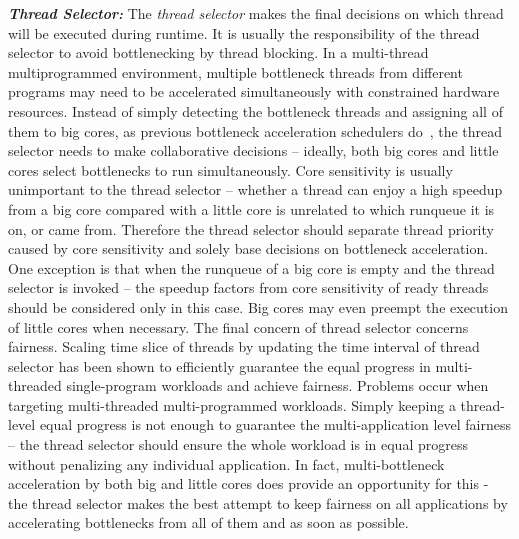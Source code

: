 \textbf{\textit{Thread Selector:}}
The \textit{thread selector} makes the final decisions on which thread will be executed during runtime. It is usually the responsibility of the thread selector to avoid bottlenecking by thread blocking. In a multi-thread multiprogrammed environment, multiple bottleneck threads from different programs may need to be accelerated simultaneously with constrained hardware resources. Instead of simply detecting the bottleneck threads and assigning all of them to big cores, as previous bottleneck acceleration schedulers do~\cite{jibaja2016portable,joao2013utility,joao2012bottleneck}, the thread selector needs to make collaborative decisions -- ideally, both big cores and little cores select bottlenecks to run simultaneously.
Core sensitivity is usually unimportant to the thread selector -- whether a thread can enjoy a high speedup from a big core compared with a little core is unrelated to which runqueue it is on, or came from. Therefore the thread selector should separate thread priority caused by core sensitivity and solely base decisions on bottleneck acceleration. One exception is that when the runqueue of a big core is empty and the thread selector is invoked -- the speedup factors from core sensitivity of ready threads should be considered only in this case. Big cores may even preempt the execution of little cores when necessary.  
The final concern of thread selector concerns fairness. Scaling time slice of threads by updating the time interval of thread selector has been shown to efficiently guarantee the equal progress \cite{van2013fairness} in multi-threaded single-program workloads and achieve fairness. 
Problems occur when targeting multi-threaded multi-programmed workloads. Simply keeping a thread-level equal progress is not enough to guarantee the multi-application level fairness -- the thread selector should ensure the whole workload is in equal progress without penalizing any individual application. In fact,  multi-bottleneck acceleration by both big and little cores does provide an opportunity for this - the thread selector makes the best attempt to keep fairness on all applications by accelerating bottlenecks from all of them and as soon as possible.




